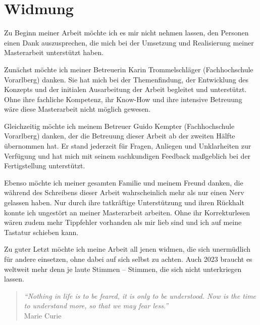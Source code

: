 \documentclass[a4paper,12pt,twoside,numbers=noendperiod]{scrreprt}
\begin{document}
\section*{Widmung}
\label{sec:widmung}

Zu Beginn meiner Arbeit möchte ich es mir nicht nehmen lassen, den Personen einen Dank auszusprechen, die mich bei der Umsetzung und Realisierung meiner Masterarbeit unterstützt haben.

\medskip

Zunächst möchte ich meiner Betreuerin Karin Trommelschläger (Fachhochschule Vorarlberg) danken. Sie hat mich bei der Themenfindung, der Entwicklung des Konzepts und der initialen Ausarbeitung der Arbeit begleitet und unterstützt. Ohne ihre fachliche Kompetenz, ihr Know-How und ihre intensive Betreuung wäre diese Masterarbeit nicht möglich gewesen.

Gleichzeitig möchte ich meinem Betreuer Guido Kempter (Fachhochschule Vorarlberg) danken, der die Betreuung dieser Arbeit ab der zweiten Hälfte übernommen hat. Er stand jederzeit für Fragen, Anliegen und Unklarheiten zur Verfügung und hat mich mit seinem sachkundigen Feedback maßgeblich bei der Fertigstellung unterstützt.

\medskip

Ebenso möchte ich meiner gesamten Familie und meinem Freund danken, die während des Schreibens dieser Arbeit wahrscheinlich mehr als nur einen Nerv gelassen haben. Nur durch ihre tatkräftige Unterstützung und ihren Rückhalt konnte ich ungestört an meiner Masterarbeit arbeiten. Ohne ihr Korrekturlesen wären zudem mehr Tippfehler vorhanden als mir lieb sind und ich auf meine Tastatur schieben kann.

\medskip

Zu guter Letzt möchte ich meine Arbeit all jenen widmen, die sich unermüdlich für andere einsetzen, ohne dabei auf sich selbst zu achten. Auch 2023 braucht es weltweit mehr denn je laute Stimmen -- Stimmen, die sich nicht unterkriegen lassen.

\bigskip

\begin{quote}
    \begin{flushright}
        \textit{\enquote{Nothing in life is to be feared, it is only to be understood. Now is the time to understand more, so that we may fear less.}}\\
        Marie Curie
    \end{flushright}
\end{quote}
\end{document}
